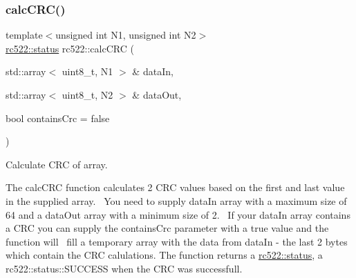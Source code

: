 \subsubsection{\texorpdfstring{calc\+C\+R\+C()}{calcCRC()}}
{\footnotesize\ttfamily template$<$unsigned int N1, unsigned int N2$>$ \\
\hyperlink{classspiReader_a4bcf984823c38cf4841ebf619e788790}{rc522\+::status} rc522\+::calc\+C\+RC (\begin{DoxyParamCaption}\item[{std\+::array$<$ uint8\+\_\+t, N1 $>$ \&}]{data\+In,  }\item[{std\+::array$<$ uint8\+\_\+t, N2 $>$ \&}]{data\+Out,  }\item[{bool}]{contains\+Crc = {\ttfamily false} }\end{DoxyParamCaption})\hspace{0.3cm}{\ttfamily [inline]}}



Calculate C\+RC of array. 

The calc\+C\+RC function calculates 2 C\+RC values based on the first and last value in the supplied array.~\newline
You need to supply data\+In array with a maximum size of 64 and a data\+Out array with a minimum size of 2.~\newline
If your data\+In array contains a C\+RC you can supply the contains\+Crc parameter with a true value and the function will~\newline
 fill a temporary array with the data from data\+In -\/ the last 2 bytes which contain the C\+RC calulations. The function returns a \hyperlink{classspiReader_a4bcf984823c38cf4841ebf619e788790}{rc522\+::status}, a rc522\+::status\+::\+S\+U\+C\+C\+E\+SS when the C\+RC was successfull. \mbox{\label{classrc522_a4034678819a3442934c55ba5c2f2588d}} 

